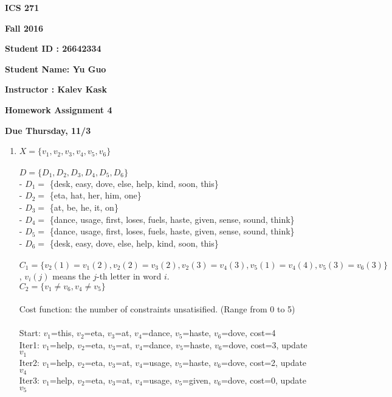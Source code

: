 \documentclass{article}
\begin{document}
{\bf ICS 271}

{\bf Fall 2016}

{\bf Student ID : 26642334}

{\bf Student Name: Yu Guo}

{\bf Instructor : Kalev Kask}

{\bf Homework Assignment 4}

{\bf Due Thursday, 11/3}




\begin{enumerate}

\item

$X = \{v_1,v_2,v_3,v_4,v_5,v_6\}$ \\ \\
$D = \{D_1,D_2,D_3,D_4,D_5,D_6\}$ \\
- $D_1 = $ \{desk, easy, dove, else, help, kind, soon, this\} \\
- $D_2 = $ \{eta, hat, her, him, one\} \\
- $D_3 = $ \{at, be, he, it, on\} \\
- $D_4 = $ \{dance, usage, first, loses, fuels, haste, given, sense, sound, think\} \\
- $D_5 = $ \{dance, usage, first, loses, fuels, haste, given, sense, sound, think\} \\
- $D_6 = $ \{desk, easy, dove, else, help, kind, soon, this\} \\ \\
$C_1 = \{v_2(1)=v_1(2), v_2(2)=v_3(2), v_2(3)=v_4(3), v_5(1)=v_4(4), v_5(3)=v_6(3)\}$, $v_i(j)$ means the $j$-th letter in word $i$. \\
$C_2 = \{v_1 \neq v_6, v_4 \neq v_5\}$ \\ \\
Cost function: the number of constraints unsatisified. (Range from 0 to 5) \\ \\
Start: $v_1$=this, $v_2$=eta, $v_3$=at, $v_4$=dance, $v_5$=haste, $v_6$=dove, cost=4\\
Iter1: $v_1$=help, $v_2$=eta, $v_3$=at, $v_4$=dance, $v_5$=haste, $v_6$=dove, cost=3, update $v_1$\\
Iter2: $v_1$=help, $v_2$=eta, $v_3$=at, $v_4$=usage, $v_5$=haste, $v_6$=dove, cost=2, update $v_4$\\
Iter3: $v_1$=help, $v_2$=eta, $v_3$=at, $v_4$=usage, $v_5$=given, $v_6$=dove, cost=0, update $v_5$\\



\end{enumerate}
\end{document}
